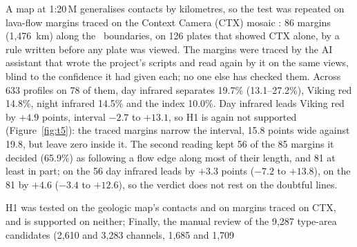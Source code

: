 A map at 1:20\,M generalises contacts by kilometres, so the test was repeated on lava-flow margins traced on the
Context Camera (CTX) mosaic \citep{Malin2007,Dickson2024}: 86 margins (1,476~km) along the \lAv\ boundaries, on 126 plates
that showed CTX alone, by a rule written before any plate was viewed. The margins were traced by the AI assistant that
wrote the project's scripts and read again by it on the same views, blind to the confidence it had given each; no one
else has checked them. Across 633 profiles on 78 of them, day infrared
separates 19.7\% (13.1--27.2\%), Viking red 14.8\%, night infrared 14.5\% and the index 10.0\%. Day infrared leads
Viking red by $+4.9$ points, interval $-2.7$ to $+13.1$, so H1 is again not supported (Figure~\ref{fig:t5}): the
traced margins narrow the interval, 15.8 points wide against 19.8, but leave zero inside it. The second reading kept
56 of the 85 margins it decided (65.9\%) as following a flow edge along most of their length, and 81 at least in part;
on the 56 day infrared leads by $+3.3$ points ($-7.2$ to $+13.8$), on the 81 by $+4.6$ ($-3.4$ to $+12.6$), so the
verdict does not rest on the doubtful lines. %
\caption{Test T5 (H1): the share of profiles that each band separates across the geologic map's \lAv\ contacts at
1:20\,M (open) and across 86 lava-flow margins traced on CTX (filled) at Athabasca Valles, with bootstrap intervals
over contacts and margins; 10\% is chance by construction. \label{fig:t5}}
H1 was tested on the geologic map's contacts and on margins traced on CTX, and is supported on neither;
Finally, the manual review of the 9,287 type-area candidates (2,610 and 3,283 channels, 1,685 and 1,709
